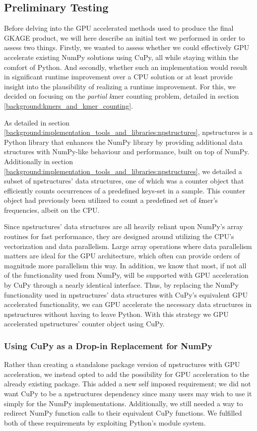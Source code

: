 \subsection{Preliminary Testing} \label{methods:preliminary_testing}
Before delving into the GPU accelerated methods used to produce the final GKAGE product, we will here describe an initial test we performed in order to assess two things. 
Firstly, we wanted to assess whether we could effectively GPU accelerate existing NumPy solutions using CuPy, all while staying within the comfort of Python. 
And secondly, whether such an implementation would result in significant runtime improvement over a CPU solution or at least provide insight into the plausibility of realizing a runtime improvement.
For this, we decided on focusing on the \textit{partial} \textit{k}mer counting problem, detailed in section \ref{background:kmers_and_kmer_counting}.

As detailed in section \ref{background:implementation_tools_and_libraries:npstructures}, npstructures is a Python library that enhances the NumPy library by providing additional data structures with NumPy-like behaviour and performance, built on top of NumPy.
Additionally in section \ref{background:implementation_tools_and_libraries:npstructures}, we detailed a subset of npstructures' data structures, one of which was a counter object that efficiently counts occurrences of a predefined keys-set in a sample.
This counter object had previously been utilized to count a predefined set of \textit{k}mer's frequencies, albeit on the CPU.

Since npstructures' data structures are all heavily reliant upon NumPy's array routines for fast performance, they are designed around utilizing the CPU's vectorization and data parallelism.
Large array operations where data parallelism matters are ideal for the GPU architecture, which often can provide orders of magnitude more parallelism this way.
In addition, we know that most, if not all of the functionality used from NumPy, will be supported with GPU acceleration by CuPy through a nearly identical interface.
Thus, by replacing the NumPy functionality used in npstructures' data structures with CuPy's equivalent GPU accelerated functionality, we can GPU accelerate the necessary data structures in npstructures without having to leave Python.
With this strategy we GPU accelerated npstructures' counter object using CuPy.

\subsubsection{Using CuPy as a Drop-in Replacement for NumPy} \label{methods:preliminary_testing:using_cupy_as_a_drop_in_replacement_for_numpy}
Rather than creating a standalone package version of npstructures with GPU acceleration, we instead opted to add the possibility for GPU acceleration to the already existing package.
This added a new self imposed requirement; we did not want CuPy to be a npstructures dependency since many users may wish to use it simply for the NumPy implementations.
Additionally, we still needed a way to redirect NumPy function calls to their equivalent CuPy functions.
We fulfilled both of these requirements by exploiting Python's module system.

